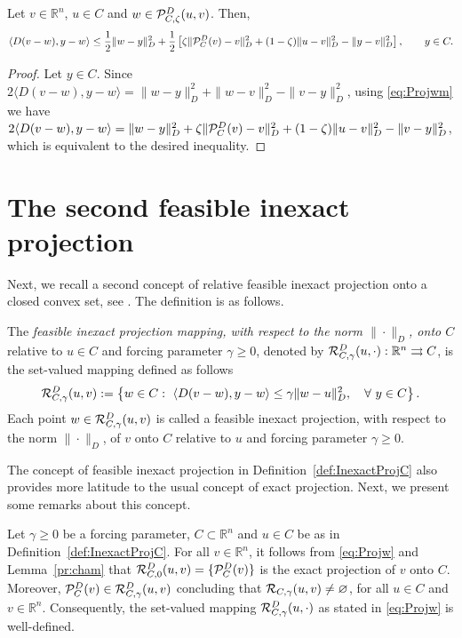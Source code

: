\begin{lemma} \label{pr:condm}
	Let $v \in {\mathbb R}^n$, $u \in C$ and $w\in {\cal P}_{C,\zeta}^{D}(u, v)$. Then,
	$$
		\left\langle D(v-w), y-w\right\rangle \leq  \frac{1}{2} \|w-y\|_{D}^2 +   \frac{1}{2} \left[\zeta \| {\cal P}_{C}^{D}(v)-v\|_{D}^2+(1-\zeta)\|u-v\|_{D}^2 - \|y-v\|_{D}^2\right] ,   \qquad y \in C.
	$$
\end{lemma}
\begin{proof}
	Let  $y \in C$. Since   $  2\langle D(v-w), y-w\rangle = \|w-y\|_{D}^2 + \|w-v\|_{D}^2-\|v-y\|_{D}^2$,  using \eqref{eq:Projwm}  we have
	$2\langle D(v-w), y-w\rangle = \|w-y\|_{D}^2 + \zeta \| {\cal P}_{C}^{D}(v)-v\|_{D}^2+(1-\zeta)\|u-v\|_{D}^2-\|v-y\|_{D}^2$, which is equivalent to  the desired inequality.
\end{proof}

\section{The second feasible inexact projection}

Next, we recall a second  concept of relative  feasible inexact projection onto a closed convex set, see  \cite{Ademir_Orizon_Leandro2020, OrizonFabianaGilson2018}.  The definition  is as follows.
\begin{definition} \label{def:InexactProjC}
	The {\it feasible inexact projection mapping, with respect to the norm $\| \cdot \|_{D}$,  onto $C$} relative to $u \in C$ and forcing parameter $\gamma\geq 0$, denoted by ${\cal R}_{C,\gamma}^{D}(u, \cdot): {\mathbb R}^n \rightrightarrows C$,  is the set-valued mapping defined as follows
	\begin{equation} \label{eq:Projw}
		{\cal R}_{C,\gamma}^{D}(u, v):= \left\{w\in C:~\left\langle D(v-w), y-w \right\rangle \leq \gamma \|w-u\|_{D}^2, \quad \forall~ y \in C \right\}.
	\end{equation}
	Each point $w\in {\cal R}_{C,\gamma}^{D}(u, v)$ is called a feasible inexact projection,  with respect to the norm $\| \cdot \|_{D}$,  of $v$ onto $C$ relative to $u$ and forcing parameter $\gamma\geq 0$.
\end{definition}
The concept of  feasible inexact projection  in Definition~\ref{def:InexactProjC} also  provides  more latitude to  the usual concept  of exact projection. Next,  we present some remarks about this concept.
\begin{remark}\normalfont%
	Let $\gamma\geq 0$ be a forcing parameter, $C\subset {\mathbb R}^n$ and $u\in C$ be as in Definition~\ref{def:InexactProjC}.
	For all $v\in {\mathbb R}^n$, it follows from \eqref{eq:Projw} and Lemma~\ref{pr:cham} that ${\cal R}_{C,0}^{D}(u, v)=\{{\cal P}_{C}^{D}(v)\}$ is the exact projection of $v$ onto $C$. Moreover, ${\cal P}_{C}^{D}(v)\in {\cal R}_{C,\gamma}^{D}(u, v)$ concluding  that ${\cal R}_{C, \gamma}(u, v)\neq \varnothing$, for all $u\in C$ and $v\in {\mathbb R}^n$. Consequently, the set-valued mapping ${\cal R}_{C,\gamma}^{D}(u, \cdot)$ as stated in \eqref{eq:Projw} is well-defined.
\end{remark}\normalfont

